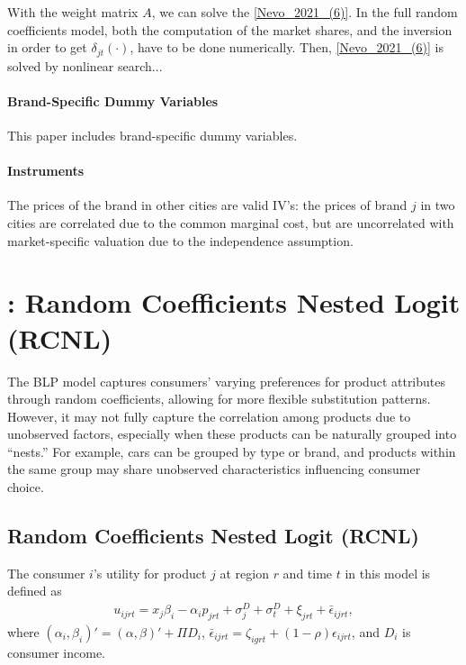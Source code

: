 \documentclass[11pt]{elegantbook}
\begin{document}
With the weight matrix $A$, we can solve the \eqref{Nevo_2021_(6)}. In the full random coefficients model, both the computation of the market shares, and the inversion in order to get $\delta_{jt}(\cdot)$, have to be done numerically. Then, \eqref{Nevo_2021_(6)} is solved by nonlinear search...

\paragraph*{Brand-Specific Dummy Variables} This paper includes brand-specific dummy variables.

\paragraph*{Instruments}
The prices of the brand in other cities are valid IV's: the prices of brand $j$ in two cities are correlated due to the common marginal cost, but are uncorrelated with market-specific valuation due to the independence assumption.


\section{\cite{miller2017understanding}: Random Coefficients Nested Logit (RCNL)}
The BLP model captures consumers' varying preferences for product attributes through random coefficients, allowing for more flexible substitution patterns. However, it may not fully capture the correlation among products due to unobserved factors, especially when these products can be naturally grouped into ``nests.'' For example, cars can be grouped by type or brand, and products within the same group may share unobserved characteristics influencing consumer choice.

\subsection{Random Coefficients Nested Logit (RCNL)}
The consumer $i$'s utility for product $j$ at region $r$ and time $t$ in this model is defined as
\begin{equation}
    \begin{aligned}
        u_{ijrt}=x_j\beta_i-\alpha_i p_{jrt}+\sigma_j^D+\sigma_t^D+\xi_{jrt}+\bar{\epsilon}_{ijrt},
    \end{aligned}
    \nonumber
\end{equation}
where $(\alpha_i,\beta_i)'=(\alpha,\beta)'+\Pi D_i$, $\bar{\epsilon}_{ijrt}=\zeta_{igrt}+(1-\rho)\epsilon_{ijrt}$, and $D_i$ is consumer income.
\end{document}
